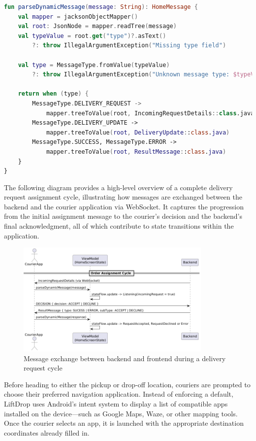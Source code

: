 \begin{lstlisting}[language=Kotlin, caption={Dynamically parsing incoming WebSocket messages}]
fun parseDynamicMessage(message: String): HomeMessage {
    val mapper = jacksonObjectMapper()
    val root: JsonNode = mapper.readTree(message)
    val typeValue = root.get("type")?.asText() 
        ?: throw IllegalArgumentException("Missing type field")

    val type = MessageType.fromValue(typeValue) 
        ?: throw IllegalArgumentException("Unknown message type: $typeValue")

    return when (type) {
        MessageType.DELIVERY_REQUEST -> 
            mapper.treeToValue(root, IncomingRequestDetails::class.java)
        MessageType.DELIVERY_UPDATE -> 
            mapper.treeToValue(root, DeliveryUpdate::class.java)
        MessageType.SUCCESS, MessageType.ERROR -> 
            mapper.treeToValue(root, ResultMessage::class.java)
    }
}
\end{lstlisting}

The following diagram provides a high-level overview of a complete delivery request assignment cycle, illustrating how messages are exchanged between the backend and the courier application via WebSocket. It captures the progression from the initial assignment message to the courier's decision and the backend's final acknowledgment, all of which contribute to state transitions within the application.


\begin{figure}[H]
    \centering
    \includegraphics[width=0.85\textwidth]{images/MessageExchangeExample.png}
    \caption{Message exchange between backend and frontend during a delivery request cycle}
    \label{fig:message-sequence}
\end{figure}

Before heading to either the pickup or drop-off location, couriers are prompted to choose their preferred navigation application. Instead of enforcing a default, LiftDrop uses Android's intent system to display a list of compatible apps installed on the device—such as Google Maps, Waze, or other mapping tools. Once the courier selects an app, it is launched with the appropriate destination coordinates already filled in.

